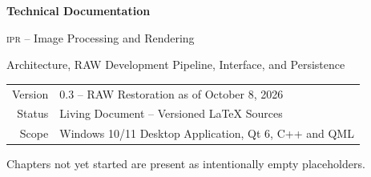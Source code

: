 \documentclass[12pt,a4paper,oneside]{report}
\newcommand{\IPR}{\textsc{ipr}}
\begin{document}
\begin{titlepage}
\centering
\vspace*{2.7cm}
{\Huge\bfseries Technical Documentation\par}
\vspace{0.35cm}
{\LARGE \IPR{} -- Image Processing and Rendering\par}
\vspace{1.2cm}
{\large Architecture, RAW Development Pipeline, Interface, and Persistence\par}
\vfill
\begin{tabular}{rl}
Version & 0.3 -- RAW Restoration as of October 8, 2026\\
Status & Living Document -- Versioned LaTeX Sources\\
Scope & Windows 10/11 Desktop Application, Qt 6, C++ and QML
\end{tabular}
\vfill
{\small Chapters not yet started are present as intentionally empty placeholders.}
\end{titlepage}

\hypersetup{pageanchor=true}
\tableofcontents
\clearpage
{}













\clearpage
{}


\end{document}
